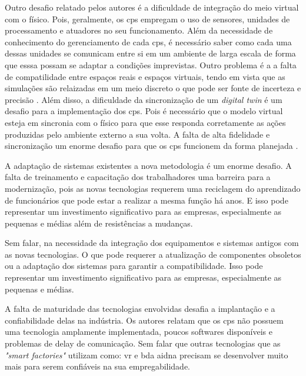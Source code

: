 Outro desafio relatado pelos autores \textcite{PENAS201752} é a dificuldade de integração do meio virtual com o físico. Pois, geralmente, os \acrshort{cps}  empregam o uso de sensores, unidades de processamento e atuadores no seu funcionamento. Além da necessidade de conhecimento do gerenciamento de cada  \acrshort{cps}, é necessário saber como cada uma dessas unidades se comunicam entre si em um ambiente de larga escala de forma que esssa possam se adaptar a condições imprevistas. Outro problema é a a falta de compatilidade entre espaços reais e espaços virtuais, tendo em vista que as simulações são relaizadas em um meio discreto o que pode ser fonte de incerteza e precisão \cite{Rikalovic2022}. Além disso, a dificuldade da sincronização de um \emph{digital twin} é um desafio para a implementação dos \acrshort{cps}. Pois é necessário que o modelo virtual esteja em sincronia com o físico para que esse responda corretamente as ações produzidas pelo ambiente externo a sua volta. A falta de alta fidelidade e sincronização um enorme desafio para que os \acrshort{cps} funcionem da forma planejada \cite{Zhang2017}. 

A adaptação de sistemas existentes a nova metodologia é um enorme desafio. A falta de treinamento e capacitação dos trabalhadores uma barreira  para a modernização, pois as novas tecnologias requerem uma reciclagem do aprendizado de funcionários que pode estar a realizar a mesma função há anos. E isso pode representar um investimento significativo para as empresas, especialmente as pequenas e médias além de resistências a mudanças. 

Sem falar, na necessidade da integração dos equipamentos e sistemas antigos com as novas tecnologias. O que pode requerer a atualização de componentes obsoletos ou a adaptação dos sistemas para garantir a compatibilidade. Isso pode representar um investimento significativo para as empresas, especialmente as pequenas e médias. 

A falta de maturidade das tecnologias envolvidas desafia a implantação e a confiabilidade delas na indústria. Os autores \textcite{Rikalovic2022} relatam que os \acrshort{cps} não possuem uma tecnologia amplamente implementada, poucos softwares disponíveis e problemas de delay de comunicação. Sem falar que outras tecnologias que as \emph{"smart factories"} utilizam como: \acrfull{vr} e \acrfull{bda} aidna precisam se desenvolver muito mais para serem confiáveis na sua empregabilidade.

